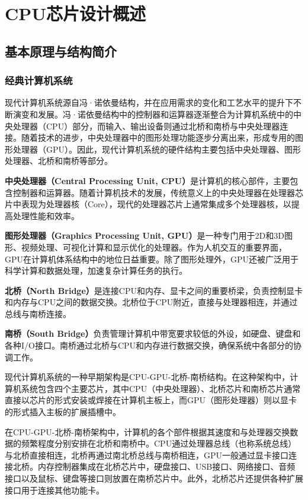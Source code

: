 
\chapter{CPU芯片设计概述}\label{chap:01-overview}

\section{基本原理与结构简介}\label{sec:01-overview-001}

\subsection{经典计算机系统}\label{sec:01-overview-002}

现代计算机系统源自冯·诺依曼结构，并在应用需求的变化和工艺水平的提升下不断演变和发展。冯·诺依曼结构中的控制器和运算器逐渐整合为计算机系统中的中央处理器（CPU）部分，而输入、输出设备则通过北桥和南桥与中央处理器连接。随着技术的进步，中央处理器中的图形处理功能逐步分离出来，形成专用的图形处理器（GPU）。因此，现代计算机系统的硬件结构主要包括中央处理器、图形处理器、北桥和南桥等部分。

\textbf{中央处理器（Central Processing Unit, CPU）}是计算机的核心部件，主要包含控制器和运算器。随着计算机技术的发展，传统意义上的中央处理器在处理器芯片中表现为处理器核（Core），现代的处理器芯片上通常集成多个处理器核，以提高处理性能和效率。

\textbf{图形处理器（Graphics Processing Unit, GPU）}是一种专门用于2D和3D图形、视频处理、可视化计算和显示优化的处理器。作为人机交互的重要界面，GPU在计算机体系结构中的地位日益重要。除了图形处理外，GPU还被广泛用于科学计算和数据处理，加速复杂计算任务的执行。

\textbf{北桥（North Bridge）}是连接CPU和内存、显卡之间的重要桥梁，负责控制显卡和内存与CPU之间的数据交换。北桥位于CPU附近，直接与处理器相连，并通过总线与南桥连接。

\textbf{南桥（South Bridge）}负责管理计算机中带宽要求较低的外设，如硬盘、键盘和各种I/O接口。南桥通过北桥与CPU和内存进行数据交换，确保系统中各部分的协调工作。

现代计算机系统的一种早期架构是CPU-GPU-北桥-南桥结构。在这种架构中，计算机系统包含四个主要芯片，其中CPU（中央处理器）、北桥芯片和南桥芯片通常直接以芯片的形式安装或焊接在计算机主板上，而GPU（图形处理器）则以显卡的形式插入主板的扩展插槽中。

在CPU-GPU-北桥-南桥架构中，计算机的各个部件根据其速度和与处理器交换数据的频繁程度分别安排在北桥和南桥中。CPU通过处理器总线（也称系统总线）与北桥直接相连，北桥再通过南北桥总线与南桥相连，GPU一般通过显卡接口连接北桥。内存控制器集成在北桥芯片中，硬盘接口、USB接口、网络接口、音频接口以及鼠标、键盘等接口则放置在南桥芯片中。此外，北桥芯片还提供各种扩展接口用于连接其他功能卡。


